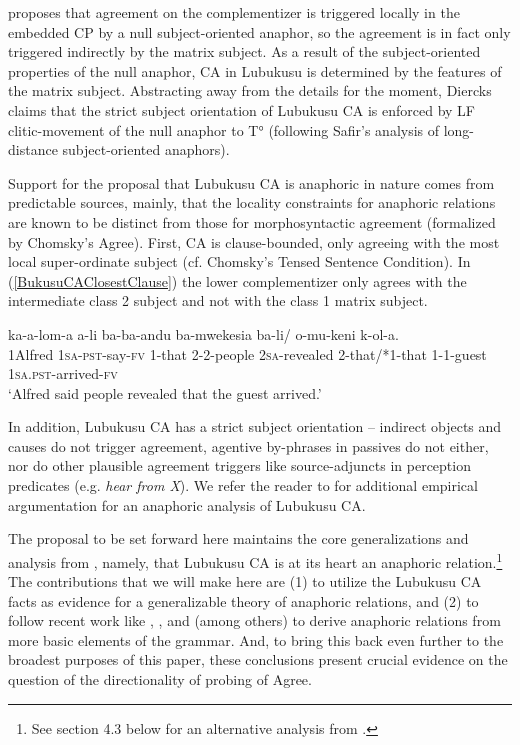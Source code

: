 \documentclass[output=paper
,modfonts
,nonflat
]{langsci/langscibook}
\begin{document}
\citet{Diercks:2013} proposes that agreement on the complementizer is triggered locally in the embedded CP by a null subject-oriented anaphor, so the agreement is in fact only triggered indirectly by the matrix subject. As a result of the subject-oriented properties of the null anaphor, CA in Lubukusu is determined by the features of the matrix subject. Abstracting away from the details for the moment, Diercks claims that the strict subject orientation of Lubukusu CA is enforced by LF clitic-movement of the null anaphor to T° (following Safir’s \citeyear{Safir:2004} analysis of long-distance subject-oriented anaphors). 

Support for the proposal that Lubukusu CA is anaphoric in nature comes from predictable sources, mainly, that the locality constraints for anaphoric relations are known to be distinct from those for morphosyntactic agreement (formalized by Chomsky’s \citeyear{Chomsky:2001} Agree). First, CA is clause-bounded, only agreeing with the most local super-ordinate subject (cf. Chomsky’s \citeyear{Chomsky:1973} Tensed Sentence Condition). In (\ref{BukusuCAClosestClause}) the lower complementizer only agrees with the intermediate class 2 subject and not with the class 1 matrix subject.\largerpage

\ea \label{BukusuCAClosestClause}
\gll {} ka-a-lom-a a-li ba-ba-andu ba-mwekesia ba-li/ o-mu-keni k-ol-a. \\
1Alfred 1\textsc{sa}-\textsc{pst}-say-\textsc{fv} 1-that 2-2-people 2\textsc{sa}-revealed {2-that/*1-that} 1-1-guest 1\textsc{sa}.\textsc{pst}-arrived-\textsc{fv} \\
\glt `Alfred said people revealed that the guest arrived.'
\z

\noindent In addition, Lubukusu CA has a strict subject orientation -- indirect objects and causes do not trigger agreement, agentive by-phrases in passives do not either, nor do other plausible agreement triggers like source-adjuncts in perception predicates (e.g. \textit{hear from X}). We refer the reader to \citet{Diercks:2010,Diercks:2013} for additional empirical argumentation for an anaphoric analysis of Lubukusu CA.

The proposal to be set forward here maintains the core generalizations and analysis from \citet{Diercks:2013}, namely, that Lubukusu CA is at its heart an anaphoric relation.\footnote{See section 4.3 below for an alternative analysis from \citet{Carstens:2016}.} The contributions that we will make here are (1) to utilize the Lubukusu CA facts as evidence for a generalizable theory of anaphoric relations, and (2) to follow recent work like \citet{Hicks:2009}, \citet{Reuland:2005,Reuland:2011}, and \citet{Rooryck:2011} (among others) to derive anaphoric relations from more basic elements of the grammar. And, to bring this back even further to the broadest purposes of this paper, these conclusions present crucial evidence on the question of the directionality of probing of Agree. 
\end{document}
